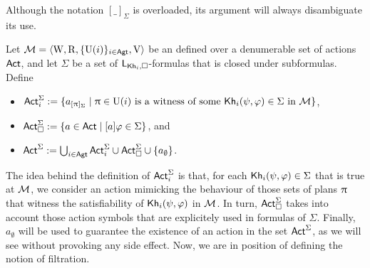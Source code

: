 \medskip

Although the notation $[\_]_\Sigma$ is overloaded, its argument will always disambiguate its use.

\medskip

\begin{definition}\label{def:filtration-actions}
Let $\mathcal{M} = \langle \operatorname{W},\operatorname{R}, \{ \operatorname{U}(i) \}_{i\in {\rm \sf Agt}}, \operatorname{V} \rangle$ be an \ults defined over a denumerable set of actions ${\rm \sf Act}$, and let $\Sigma$ be a set of $\mathsf{L}_{{\sf Kh}_i,\square}$-formulas that is closed under subformulas.
Define
\begin{itemize}
\item ${\rm \sf Act}^{\Sigma}_i := \{ a_{[\uppi]_\Sigma} \mid \uppi\in\operatorname{U}(i) \text{ is a witness of some } {\sf Kh}_i(\psi,\varphi)\in\Sigma \text{ in } \mathcal{M} \}$,
\item ${\rm \sf Act}^\Sigma_{\square} := \{ a \in {\rm \sf Act} \mid [a]\varphi \in \Sigma \}$, and
\item ${\rm \sf Act}^\Sigma := \bigcup_{i\in{\rm \sf Agt}} {\rm \sf Act}^\Sigma_i \cup {\rm \sf Act}^\Sigma_{\square}\cup \{ a_\emptyset \}$.
\end{itemize} 
\end{definition}

\medskip

The idea behind the definition of ${\rm \sf Act}^{\Sigma}_i$ is that, for each ${\sf Kh}_i(\psi,\varphi)\in\Sigma$ that is true at $\mathcal{M}$, we consider an action mimicking the behaviour of those sets of plans $\uppi$ that witness the satisfiability of ${\sf Kh}_i(\psi,\varphi)$ in $\mathcal{M}$. In turn, ${\rm \sf Act}^\Sigma_{\square}$ takes into account those action symbols that are explicitely used in formulas of $\Sigma$. Finally, $a_\emptyset$ will be used to guarantee the existence of an action in the set ${\rm \sf Act}^\Sigma$, as we will see without provoking any side effect. 
Now, we are in position of defining the notion of filtration. 

\medskip

